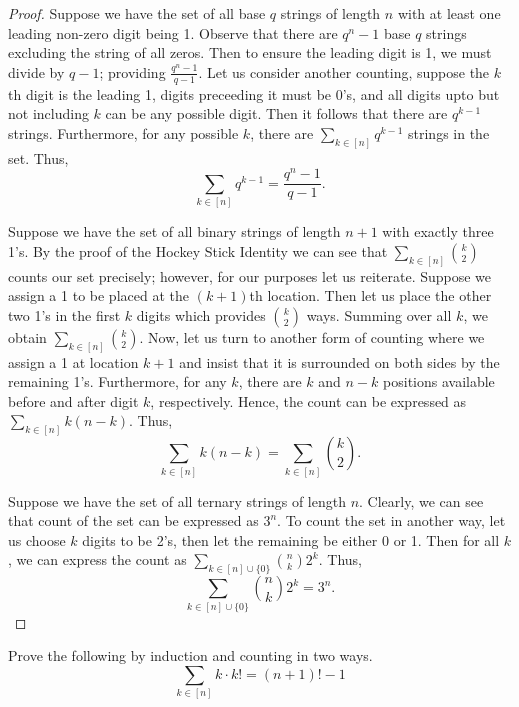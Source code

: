 \documentclass[ 12pt ]{article}
\begin{document}
\begin{enumerate}
\begin{proof}
			\item[\textbf{iii.}] Suppose we have the set of all base $q$ strings of length $n$ with at least one leading non-zero digit being 1. Observe that there are $q^n - 1$
				base $q$ strings excluding the string of all zeros. Then to ensure the leading digit is 1, we must divide by $q-1$; providing $\frac{q^n - 1}{q - 1}$. Let us consider
				another counting, suppose the $k$th digit is the leading 1, digits preceeding it must be 0's, and all digits upto but not including $k$ can be any possible digit.
				Then it follows that there are $q^{k-1}$ strings. Furthermore, for any possible $k$, there are $\sum_{k \in [n]} q^{k-1}$ strings in the set. Thus,
				$$\sum_{k \in [n]} q^{k-1} = \frac{q^n - 1}{q - 1}.$$

			\item[\textbf{iv.}] Suppose we have the set of all binary strings of length $n+1$ with exactly three 1's. By the proof of the Hockey Stick Identity we can see that
				$\sum_{k \in [n]} \binom{k}{2}$ counts our set precisely; however, for our purposes let us reiterate. Suppose we assign a 1 to be placed at the $(k+1)$th location.
				Then let us place the other two 1's in the first $k$ digits which provides $\binom{k}{2}$ ways. Summing over all $k$, we obtain $\sum_{k \in [n]} \binom{k}{2}$.
				Now, let us turn to another form of counting where we assign a 1 at location $k+1$ and insist that it is surrounded on both sides by the remaining 1's. Furthermore,
				for any $k$, there are $k$ and $n-k$ positions available before and after digit $k$, respectively. Hence, the count can be expressed as $\sum_{k \in [n]} k(n-k)$.
				Thus, $$\sum_{k \in [n]} k(n-k) = \sum_{k \in [n]} \binom{k}{2}.$$

			\item[\textbf{v.}] Suppose we have the set of all ternary strings of length $n$. Clearly, we can see that count of the set can be expressed as $3^n$. To count the
				set in another way, let us choose $k$ digits to be 2's, then let the remaining be either 0 or 1. Then for all $k$, we can express the count as
				$\sum_{k \in [n] \cup \{ 0 \}} \binom{n}{k} 2^k$. Thus, $$\sum_{k \in [n] \cup \{ 0 \}} \binom{n}{k} 2^k = 3^n.$$
		\end{proof}


	\item[\textbf{4.}] Prove the following by induction and counting in two ways. $$\sum_{k \in [n]} k \cdot k! = (n+1)! - 1$$


\end{enumerate}
\end{document}
